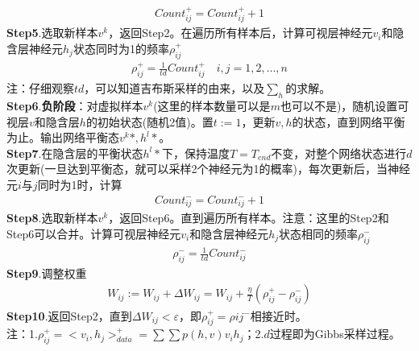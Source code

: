             \begin{align*}
            Count_{ij}^+ = Count_{ij}^+ +1
            \end{align*}
            \textbf{Step5}.选取新样本$v^k$，返回Step2。在遍历所有样本后，计算可视层神经元$v_i$和隐含层神经元$h_j$状态同时为1的频率$\rho_{ij}^+$
            \begin{align*}
            \rho_{ij}^+ = \frac{1}{td} Count_{ij}^+ \quad i,j =1,2,\dots,n
            \end{align*}
            注：仔细观察$td$，可以知道吉布斯采样的由来，以及$\sum_h$的求解。\\
            \textbf{Step6}.\textbf{负阶段}：对虚拟样本$v^k$(这里的样本数量可以是$m$也可以不是)，随机设置可视层$v$和隐含层$h$的初始状态(随机2值)。置$t:=1$，更新$v,h$的状态，直到网络平衡为止。输出网络平衡态$v^k*,h^l*$。\\
            \textbf{Step7}.在隐含层的平衡状态$h^l*$下，保持温度$T= T_{end}$不变，对整个网络状态进行$d$次更新(一旦达到平衡态，就可以采样2个神经元为1的概率)，每次更新后，当神经元$i$与$j$同时为1时，计算
            \begin{align*}
            Count_{ij}^- = Count_{ij}^- +1
            \end{align*}
            \textbf{Step8}.选取新样本$v^k$，返回Step6。直到遍历所有样本。注意：这里的Step2和Step6可以合并。计算可视层神经元$v_i$和隐含层神经元$h_j$状态相同的频率$\rho_{ij}^-$
            \begin{align*}
            \rho_{ij}^- = \frac{1}{td}Count_{ij}^-
            \end{align*}
            \textbf{Step9}.调整权重
            \begin{align*}
            W_{ij} := W_{ij} +\Delta W_{ij} = W_{ij} + \frac{\eta}{T}(\rho_{ij}^+-\rho_{ij}^-)
            \end{align*}
            \textbf{Step10}.返回Step2，直到$\Delta W_{ij}<\varepsilon$，即$\rho_{ij}^+ = \rho{ij}^-$相接近时。\\
            注：1.$\rho_{ij}^+ = \big < v_i,h_j\big >_{data}^+ = \sum\sum p(h,v)v_ih_j$；2.$d$过程即为Gibbs采样过程。

